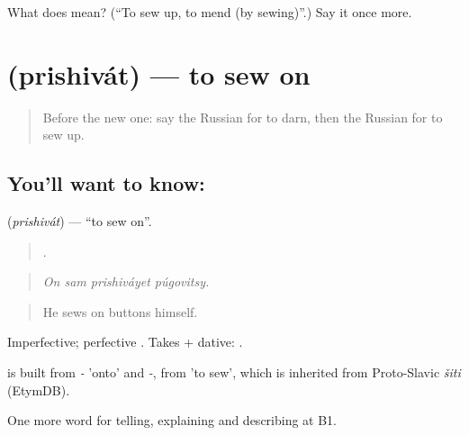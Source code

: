 \begin{tcolorbox}[breakable,colback=teal!4,colframe=teal!35!black,title={Before you move on}]
What does  mean? (\textquotedblleft{}To sew up, to mend (by sewing)\textquotedblright{}.) Say it once more.
\end{tcolorbox}
\section[\texorpdfstring{\ru{пришивать} (prishivát)}{пришивать (prishivát)}]{ (prishivát) — to sew on}

\label{lesson:RU-C448-prishivat}



\begin{quote}
Before the new one: say the Russian for to darn, then the Russian for to sew up.
\end{quote}

\subsection*{You'll want to know: }
\textbf{} (\emph{prishivát}) — \textquotedblleft{}to sew on\textquotedblright{}.

\begin{quote}
   .
\end{quote}

\begin{quote}
\emph{On sam prishiváyet púgovitsy.}
\end{quote}

\begin{quote}
He sews on buttons himself.
\end{quote}

Imperfective; perfective \emph{}. Takes \emph{} + dative: \emph{   }.

\begin{cousinweb}
\emph{} is built from \emph{-} 'onto' and \emph{-}, from \emph{} 'to sew', which is inherited from Proto-Slavic \emph{šiti} (EtymDB).
\end{cousinweb}

\begin{grammarlens}[title={What you've built}]
One more word for telling, explaining and describing at B1.
\end{grammarlens}

